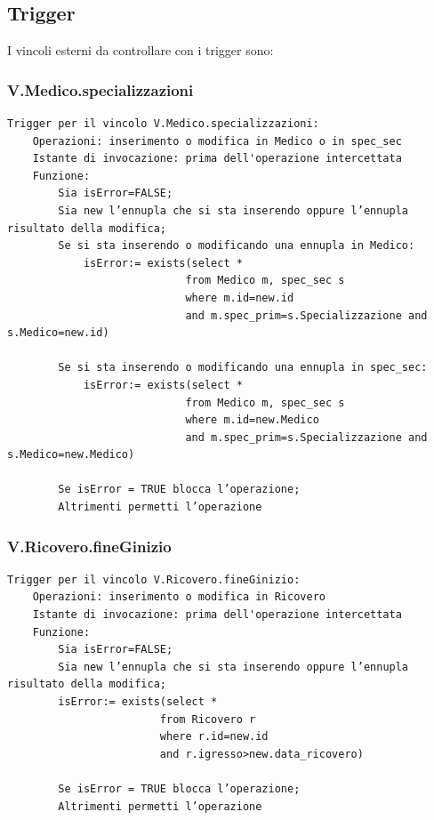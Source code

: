 \documentclass[12pt, letterpaper]{article}
\begin{document}
\subsection{Trigger}
I vincoli esterni da controllare con i trigger sono:

\subsubsection{V.Medico.specializzazioni}
\begin{verbatim}
Trigger per il vincolo V.Medico.specializzazioni:
    Operazioni: inserimento o modifica in Medico o in spec_sec
    Istante di invocazione: prima dell'operazione intercettata
    Funzione:
        Sia isError=FALSE;
        Sia new l’ennupla che si sta inserendo oppure l’ennupla risultato della modifica;
        Se si sta inserendo o modificando una ennupla in Medico:
            isError:= exists(select * 
                            from Medico m, spec_sec s 
                            where m.id=new.id 
                            and m.spec_prim=s.Specializzazione and s.Medico=new.id)
        
        Se si sta inserendo o modificando una ennupla in spec_sec:
            isError:= exists(select * 
                            from Medico m, spec_sec s 
                            where m.id=new.Medico 
                            and m.spec_prim=s.Specializzazione and s.Medico=new.Medico)
        
        Se isError = TRUE blocca l’operazione;
        Altrimenti permetti l’operazione
\end{verbatim}
\subsubsection{V.Ricovero.fineGinizio}
\begin{verbatim}
Trigger per il vincolo V.Ricovero.fineGinizio:
    Operazioni: inserimento o modifica in Ricovero
    Istante di invocazione: prima dell'operazione intercettata
    Funzione:
        Sia isError=FALSE;
        Sia new l’ennupla che si sta inserendo oppure l’ennupla risultato della modifica;
        isError:= exists(select * 
                        from Ricovero r
                        where r.id=new.id 
                        and r.igresso>new.data_ricovero)
        
        Se isError = TRUE blocca l’operazione;
        Altrimenti permetti l’operazione
\end{verbatim} \newpage
\end{document}
